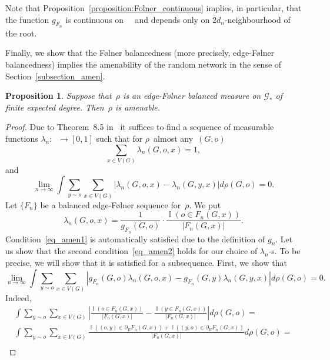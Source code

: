 \documentclass[english]{article}
\newtheorem{proposition}[lemma]{Proposition}
\theoremstyle{definition}
\DeclareMathOperator{\I}{{\mathbb{I}}}
\DeclareMathOperator{\Gr}{{\mathcal{G}_*}}
\DeclareMathOperator{\Grr}{{\mathcal{G}_{**}}}
\begin{document}
Note that Proposition~\ref{proposition:Folner_continuous} implies, in particular, that the function $g_{F_n}$ is continuous on~$\Gr$ and depends only on $2d_n$-neighbourhood of the root.


Finally, we show that the {F\o lner} balancedness (more precisely, edge-{F\o lner} balancedness) implies the amenability of the random network in the sense of Section~\ref{subsection_amen}.

\begin{proposition}\label{proposition:balance_implies_amen}
    Suppose that~$\rho$ is an edge-{F\o lner} balanced measure on $\mathcal{G}_*$ of finite expected degree. Then~$\rho$ is amenable. 
\end{proposition}

\begin{proof}
    Due to Theorem~8.5 in~\cite{AL07} it suffices to find a sequence of measurable functions $\lambda_n \colon \Grr \to [0,1]$ such that for $\rho$~almost any~$(G,o)$
    \begin{equation}\label{eq_amen1}
        \sum_{x \in V(G)} \lambda_n(G, o, x) = 1,
    \end{equation}
    and
    \begin{equation}\label{eq_amen2}
        \lim_{n\to \infty} \int \sum_{y \sim o} \sum_{x \in V(G)} |\lambda_n(G,o,x) - \lambda_n(G,y,x)| d \rho(G,o) = 0.
    \end{equation}
    Let $\{F_n\}$ be a balanced edge-F\o lner sequence for~$\rho$. We put
    $$
    \lambda_n(G,o, x) = \frac{1}{g_{F_n}(G,o)} \cdot\frac{\I(o \in F_n(G,x))}{ |F_n(G,x)|}.
    $$
    Condition~\eqref{eq_amen1} is automatically satisfied due to the definition of $g_n$. Let us show that the second condition~\eqref{eq_amen2} holds for our choice of $\lambda_n$-s. To be precise, we will show that it is satisfied for a subsequence. First, we show that
    \begin{equation}\label{eq_amen3}
        \lim_{n\to \infty} \int \sum_{y \sim o} \sum_{x \in V(G)} |g_{F_n}(G,o)\lambda_n(G,o,x) - g_{F_n} (G,y)\lambda_n(G,y,x)| d \rho(G,o) = 0.
    \end{equation}
    Indeed, 
    \begin{multline}\label{eq_am4567567}
        \int \sum_{y\sim o}\sum_{x \in V(G)} \left| \frac{\I(o \in F_n(G,x))}{ |F_n(G,x)|} - \frac{\I(y \in F_n(G,x))}{ |F_n(G,x)|} \right| d \rho(G,o) = \\
        \int \sum_{y\sim o} \sum_{x\in V(G)} \frac{\I((o,y) \in \partial_E F_n(G,x)) + \I((y,o) \in \partial_E F_n(G,x))}{ |F_n(G,x)|} d \rho(G,o) = \\

\end{multline}
\end{proof}
\end{document}
